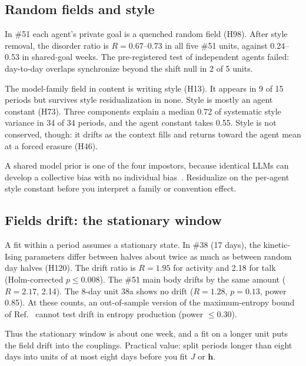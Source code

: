 \subsection{Random fields and style}

In \#51 each agent's private goal is a quenched random field (H98). After style removal, the disorder ratio is $R=0.67$--0.73 in all five \#51 units, against 0.24--0.53 in shared-goal weeks. The pre-registered test of independent agents failed: day-to-day overlaps synchronize beyond the shift null in 2 of 5 units.

The model-family field in content is writing style (H13). It appears in 9 of 15 periods but survives style residualization in none. Style is mostly an agent constant (H73). Three components explain a median 0.72 of systematic style variance in 34 of 34 periods, and the agent constant takes 0.55. Style is not conserved, though: it drifts as the context fills and returns toward the agent mean at a forced erasure (H46).

A shared model prior is one of the four impostors, because identical LLMs can develop a collective bias with no individual bias~\cite{ashery2025}. Residualize on the per-agent style constant before you interpret a family or convention effect.

\subsection{Fields drift: the stationary window}

A fit within a period assumes a stationary state. In \#38 (17 days), the kinetic-Ising parameters differ between halves about twice as much as between random day halves (H120). The drift ratio is $R=1.95$ for activity and 2.18 for talk (Holm-corrected $p\le0.008$). The \#51 main body drifts by the same amount ($R=2.17$, 2.14). The 8-day unit 38a shows no drift ($R=1.28$, $p=0.13$, power 0.85). At these counts, an out-of-sample version of the maximum-entropy bound of Ref.~\cite{aguilera2026} cannot test drift in entropy production (power $\le0.30$).

Thus the stationary window is about one week, and a fit on a longer unit puts the field drift into the couplings. Practical value: split periods longer than eight days into units of at most eight days before you fit $J$ or $\mathbf h$.

